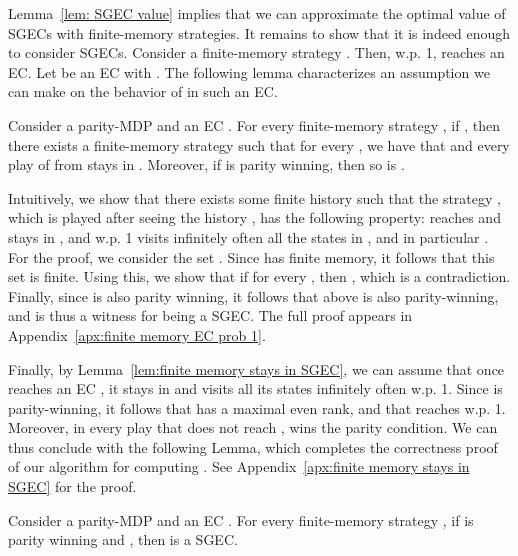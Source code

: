 \documentclass[runningheads,a4paper]{llncs}
\newcommand{\sgec}{{SGEC}\xspace}
\newcommand{\sgecs}{{SGECs}\xspace}
\begin{document}
\vspace*{-10pt}
Lemma~\ref{lem: SGEC value} implies that we can approximate the optimal value of \sgecs with finite-memory strategies. 
It remains to show that it is indeed enough to consider \sgecs. Consider a finite-memory strategy . Then, w.p. 1,  reaches an EC. Let  be an EC with . The following lemma characterizes an assumption we can make on the behavior of  in such an EC.
\vspace*{-5pt}
\begin{lemma}
\label{lem:finite memory EC prob 1}
Consider a parity-MDP  and an EC . For every finite-memory strategy , if , then there exists a finite-memory strategy  such that for every , we have that  and every play of  from  stays in . Moreover, if  is parity winning, then so is .
\end{lemma}
\vspace*{-5pt}


Intuitively, we show that there exists some finite history  such that the strategy , which is  played after seeing the history , has the following property:  reaches and stays in , and w.p. 1 visits infinitely often all the states in , and in particular . 
For the proof, we consider the set . Since  has finite memory, it follows that this set is finite. Using this, we show that if  for every , then , which is a contradiction. 
Finally, since  is also parity winning, it follows that  above is also parity-winning, and is thus a witness for  being a \sgec. 
The full proof appears in Appendix~\ref{apx:finite memory EC prob 1}.

Finally, by Lemma~\ref{lem:finite memory stays in SGEC}, we can assume that once  reaches an EC , it stays in  and visits all its states infinitely often w.p. 1. Since  is parity-winning, it follows that  has a maximal even rank, and that  reaches  w.p. 1. Moreover, in every play that does not reach ,  wins the parity condition. We can thus conclude with the following Lemma, which completes the correctness proof of our algorithm for computing . See Appendix~\ref{apx:finite memory stays in SGEC} for the proof.
\vspace*{-5pt}
\begin{lemma}
\label{lem:finite memory stays in SGEC}
Consider a parity-MDP  and an EC . For every finite-memory strategy , if  is parity winning and , then  is a \sgec.
\end{lemma}


\vspace*{-20pt}
\end{document}
